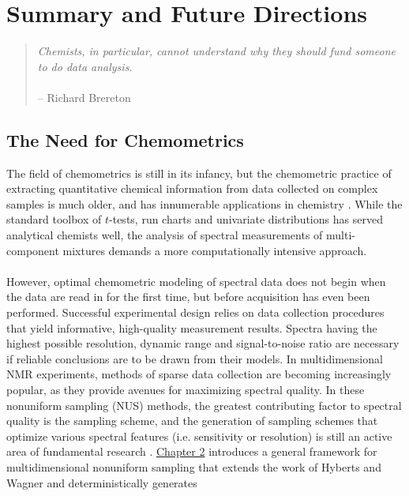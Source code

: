 
\chapter{Summary and Future Directions}

\begin{quote}
{\it
  Chemists, in particular, cannot understand why they should fund
  someone to do data analysis.}
\\\\
 -- Richard Brereton \cite{brereton:jchemo2014b}
\end{quote}

\section{The Need for Chemometrics}

\begin{doublespace}
The field of chemometrics is still in its infancy, but the chemometric
practice of extracting quantitative chemical information from data collected
on complex samples is much older, and has innumerable applications in
chemistry \cite{wold:cils1995,brereton:jchemo2014b}. While the standard
toolbox of $t$-tests, run charts and univariate distributions has served
analytical chemists well, the analysis of spectral measurements of
multi-component mixtures demands a more computationally intensive
approach.
\\\\
However, optimal chemometric modeling of spectral data does not begin when
the data are read in for the first time, but before acquisition has even
been performed. Successful experimental design relies on data collection
procedures that yield informative, high-quality measurement results. Spectra
having the highest possible resolution, dynamic range and signal-to-noise
ratio are necessary if reliable conclusions are to be drawn from their models.
In multidimensional NMR experiments, methods of sparse data collection are
becoming increasingly popular, as they provide avenues for maximizing spectral
quality. In these nonuniform sampling (NUS) methods, the greatest contributing
factor to spectral quality is the sampling scheme, and the generation of
sampling schemes that optimize various spectral features (i.e. sensitivity
or resolution) is still an active area of fundamental research
\cite{mobli:jmr2015}. \hyperlink{chapter.2}{Chapter 2} introduces a general
framework for multidimensional nonuniform sampling that extends the work of
Hyberts and Wagner \cite{hyberts:jacs2010} and deterministically generates

\end{doublespace}
